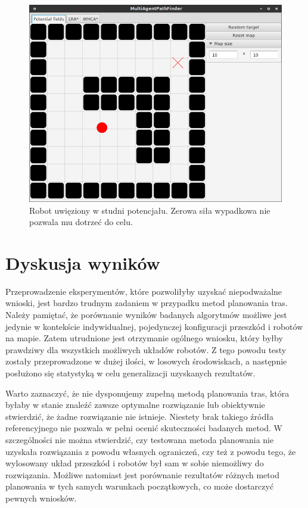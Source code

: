 \begin{figure}
	\centering
	\includegraphics[width=0.7\columnwidth]{img/robopath/field-potential-hole}
	\caption{Robot uwięziony w studni potencjału. Zerowa siła wypadkowa nie pozwala mu dotrzeć do celu.}
	\label{fig:test-field-potential-hole}
\end{figure}

\section{Dyskusja wyników}
Przeprowadzenie eksperymentów, które pozwoliłyby uzyskać niepodważalne wnioski, jest bardzo trudnym zadaniem w przypadku metod planowania tras.
Należy pamiętać, że porównanie wyników badanych algorytmów możliwe jest jedynie w kontekście indywidualnej, pojedynczej konfiguracji przeszkód i robotów na mapie.
Zatem utrudnione jest otrzymanie ogólnego wniosku, który byłby prawdziwy dla wszystkich możliwych układów robotów.
Z tego powodu testy zostały przeprowadzone w dużej ilości, w losowych środowiskach, a następnie posłużono się statystyką w celu generalizacji uzyskanych rezultatów.

Warto zaznaczyć, że nie dysponujemy zupełną metodą planowania tras, która byłaby w stanie znaleźć zawsze optymalne rozwiązanie lub obiektywnie stwierdzić, że żadne rozwiązanie nie istnieje.
Niestety brak takiego źródła referencyjnego nie pozwala w pełni ocenić skuteczności badanych metod. W szczególności nie można stwierdzić, czy testowana metoda planowania nie uzyskała rozwiązania z powodu własnych ograniczeń, czy też z powodu tego, że wylosowany układ przeszkód i robotów był sam w sobie niemożliwy do rozwiązania.
Możliwe natomiast jest porównanie rezultatów różnych metod planowania w tych samych warunkach początkowych, co może dostarczyć pewnych wniosków.

